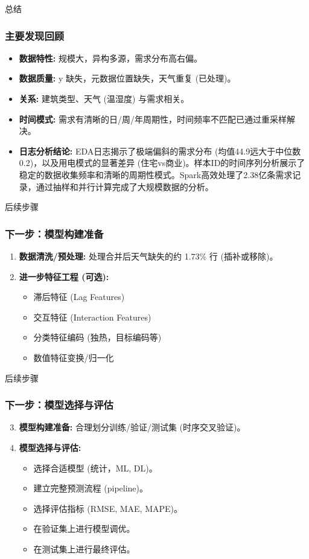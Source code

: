 \documentclass{beamer} %
\begin{document}
\begin{frame}{总结}
    \frametitle{主要发现回顾}
    \begin{itemize}
        \item \textbf{数据特性:} 规模大，异构多源，需求分布高右偏。
        \item \textbf{数据质量:} y 缺失，元数据位置缺失，天气重复 (已处理)。
        \item \textbf{关系:} 建筑类型、天气 (温湿度) 与需求相关。
        \item \textbf{时间模式:} 需求有清晰的日/周/年周期性，时间频率不匹配已通过重采样解决。
        \item \textbf{日志分析结论:} EDA日志揭示了极端偏斜的需求分布 (均值44.9远大于中位数0.2)，以及用电模式的显著差异 (住宅vs商业)。样本ID的时间序列分析展示了稳定的数据收集频率和清晰的周期性模式。Spark高效处理了2.38亿条需求记录，通过抽样和并行计算完成了大规模数据的分析。
    \end{itemize}
\end{frame}

\begin{frame}{后续步骤}
    \frametitle{下一步：模型构建准备}
    \begin{enumerate}
        \item \textbf{数据清洗/预处理:} 处理合并后天气缺失的约 1.73\% 行 (插补或移除)。
        \item \textbf{进一步特征工程 (可选):}
        \begin{itemize}
            \item 滞后特征 (Lag Features)
            \item 交互特征 (Interaction Features)
            \item 分类特征编码 (独热，目标编码等)
            \item 数值特征变换/归一化
        \end{itemize}
    \end{enumerate}
\end{frame}

\begin{frame}{后续步骤}
    \frametitle{下一步：模型选择与评估}
    \begin{enumerate}
        \setcounter{enumi}{2} %
        \item \textbf{模型构建准备:} 合理划分训练/验证/测试集 (时序交叉验证)。
        \item \textbf{模型选择与评估:}
        \begin{itemize}
            \item 选择合适模型 (统计，ML, DL)。
            \item 建立完整预测流程 (pipeline)。
            \item 选择评估指标 (RMSE, MAE, MAPE)。
            \item 在验证集上进行模型调优。
            \item 在测试集上进行最终评估。
        \end{itemize}
    \end{enumerate}
\end{frame}
\end{document}
